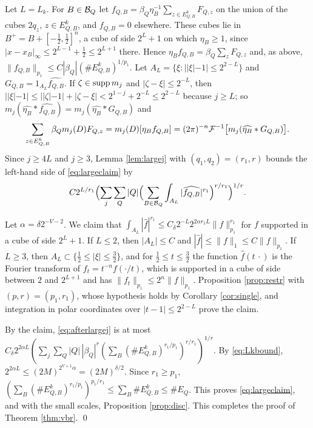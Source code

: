 Let $L=L_k$. For $B\in\mathcal B_Q$ let $f_{Q,B}=\beta_Q\eta_B^{-1}\sum_{z\in E^k_{Q,B}}F_{Q,z}$ on the union of the cubes
$2q_z$, $z\in E^k_{Q,B}$, and $f_{Q,B}=0$ elsewhere. These cubes lie in $B^+=B+[-\frac12,\frac12]^n$, a cube of side
$2^L+1$ on which $\eta_B\ge1$, since $|x-x_B|_\infty\le2^{L-1}+\frac12\le2^{L+1}$ there. Hence
$\eta_Bf_{Q,B}=\beta_Q\sum_zF_{Q,z}$ and, as above, $\|f_{Q,B}\|_{p_1}\le C|\beta_Q|(\#E^k_{Q,B})^{1/p_1}$. Let
$A_L=\{\xi:||\xi|-1|\le2^{2-L}\}$ and $G_{Q,B}=1_{A_L}\widehat{f_{Q,B}}$. If $\zeta\in\operatorname{supp} m_j$ and $|\zeta-\xi|\le2^{-L}$, then
$||\xi|-1|\le||\zeta|-1|+|\zeta-\xi|<2^{1-j}+2^{-L}\le2^{2-L}$ because $j\ge L$; so
$m_j(\widehat{\eta_B}*\widehat{f_{Q,B}})=m_j(\widehat{\eta_B}*G_{Q,B})$ and
\[
\sum_{z\in E^k_{Q,B}}\beta_Qm_j(D)F_{Q,z}=m_j(D)[\eta_Bf_{Q,B}]=(2\pi)^{-n}\mathcal F^{-1}\bigl[m_j(\widehat{\eta_B}*G_{Q,B})\bigr].
\]
Since $j\ge4L$ and $j\ge3$, Lemma \ref{lem:largej} with $(q_1,q_2)=(r_1,r)$ bounds the left-hand side of
\eqref{eq:largeclaim} by
\begin{equation}\label{eq:afterlargej}
C2^{L/r_1}\Bigl(\sum_j\sum_Q|Q|\Bigl(\sum_{B\in\mathcal B_Q}\int_{A_L}|\widehat{f_{Q,B}}|^{r_1}\Bigr)^{r/r_1}\Bigr)^{1/r}.
\end{equation}

Let $\alpha=\delta2^{-V-2}$. We claim that $\int_{A_L}|\hat f|^{r_1}\le C_\delta2^{-L}2^{2\alpha r_1L}\|f\|_{p_1}^{r_1}$ for $f$ supported
in a cube of side $2^L+1$. If $L\le2$, then $|A_L|\le C$ and $|\hat f|\le\|f\|_1\le C\|f\|_{p_1}$. If $L\ge3$, then
$A_L\subset\{\frac12\le|\xi|\le\frac32\}$, and for $\frac12\le t\le\frac32$ the function $\hat f(t\,\cdot)$ is the Fourier transform of
$f_t=t^{-n}f(\cdot/t)$, which is supported in a cube of side between $2$ and $2^{L+1}$ and has
$\|f_t\|_{p_1}\le2^n\|f\|_{p_1}$. Proposition \ref{prop:restr} with $(p,r)=(p_1,r_1)$, whose hypothesis holds by
Corollary \ref{cor:single}, and integration in polar coordinates over $|t-1|\le2^{2-L}$ prove the claim.

By the claim, \eqref{eq:afterlargej} is at most
$C_\delta2^{2\alpha L}(\sum_j\sum_Q|Q|\,|\beta_Q|^r(\sum_B(\#E^k_{Q,B})^{r_1/p_1})^{r/r_1})^{1/r}$. By \eqref{eq:Lkbound},
$2^{2\alpha L}\le(2M)^{2^{V+1}\alpha}=(2M)^{\delta/2}$. Since $r_1\ge p_1$,
$(\sum_B(\#E^k_{Q,B})^{r_1/p_1})^{p_1/r_1}\le\sum_B\#E^k_{Q,B}\le\#E_Q$. This proves \eqref{eq:largeclaim}, and with the small
scales, Proposition \ref{prop:disc}. This completes the proof of Theorem \ref{thm:vbr}. \qed
